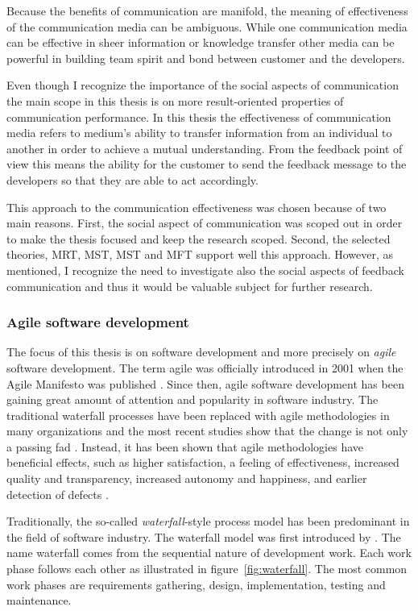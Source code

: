 \documentclass[english,12pt,a4paper,pdftex]{article}
\begin{document}
Because the benefits of communication are manifold, the meaning of effectiveness of the communication media can be ambiguous. While one communication media can be effective in sheer information or knowledge transfer other media can be powerful in building team spirit and bond between customer and the developers.

Even though I recognize the importance of the social aspects of communication the main scope in this thesis is on more result-oriented properties of communication performance. In this thesis the effectiveness of communication media refers to medium's ability to transfer information from an individual to another in order to achieve a mutual understanding. From the feedback point of view this means the ability for the customer to send the feedback message to the developers so that they are able to act accordingly.

This approach to the communication effectiveness was chosen because of two main reasons. First, the social aspect of communication was scoped out in order to make the thesis focused and keep the research scoped. Second, the selected theories, \ac{MRT}, \ac{MST}, \ac{MST} and \ac{MFT} support well this approach. However, as mentioned, I recognize the need to investigate also the social aspects of feedback communication and thus it would be valuable subject for further research.

\subsubsection{Agile software development}

The focus of this thesis is on software development and more precisely on \emph{agile} software development. The term agile was officially introduced in 2001 when the Agile Manifesto was published \citep{agilemanifesto}. Since then, agile software development has been gaining great amount of attention and popularity in software industry. The traditional waterfall processes have been replaced with agile methodologies in many organizations and the most recent studies show that the change is not only a passing fad \citep{laanti2011}. Instead, it has been shown that agile methodologies have beneficial effects, such as higher satisfaction, a feeling of effectiveness, increased quality and transparency, increased autonomy and happiness, and earlier detection of defects \citep{korhonen2012}.

Traditionally, the so-called \emph{waterfall}-style process model has been predominant in the field of software industry. The waterfall model was first introduced by \citet{royce1970}. The name waterfall comes from the sequential nature of development work. Each work phase follows each other as illustrated in figure~\ref{fig:waterfall}. The most common work phases are requirements gathering, design, implementation, testing and maintenance.
\end{document}
